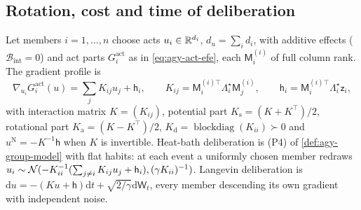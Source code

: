 \subsection{Rotation, cost and time of deliberation}\label{sec:obj-deliberation}

\begin{definition}\label{def:obj-quadratic}
Let members $i=1,\dots,n$ choose acts $u_i\in\mathbb{R}^{d_i}$, $d_u=\sum_id_i$, with additive effects ($\mathcal B_{\mathrm{int}}=0$) and act parts $G^{\mathrm{act}}_i$ as in \eqref{eq:agy-act-efe}, each $\mathsf M^{(i)}_i$ of full column rank. The gradient profile is
\begin{equation}\label{eq:obj-profile}
\nabla_{u_i}G^{\mathrm{act}}_i(u)=\sum_jK_{ij}u_j+\mathsf h_i,\qquad K_{ij}=\mathsf M^{(i)\top}_i\Lambda^\star_i\mathsf M^{(i)}_j,\qquad\mathsf h_i=\mathsf M^{(i)\top}_i\Lambda^\star_i\mathsf z_i,
\end{equation}
with interaction matrix $K=(K_{ij})$, potential part $K_{\mathrm s}=(K+K^\top)/2$, rotational part $K_{\mathrm a}=(K-K^\top)/2$, $K_{\mathrm d}=\operatorname{blockdiag}(K_{ii})\succ0$ and $u^{\mathrm N}=-K^{-1}\mathsf h$ when $K$ is invertible. Heat-bath deliberation is (P4) of \cref{def:agy-group-model} with flat habits: at each event a uniformly chosen member redraws $u_i\sim\mathcal{N}(-K_{ii}^{-1}(\sum_{j\ne i}K_{ij}u_j+\mathsf h_i),(\gamma K_{ii})^{-1})$. Langevin deliberation is $\mathrm du=-(Ku+\mathsf h)\mathrm dt+\sqrt{2/\gamma}\mathrm d\mathsf W_t$, every member descending its own gradient with independent noise.
\end{definition}

